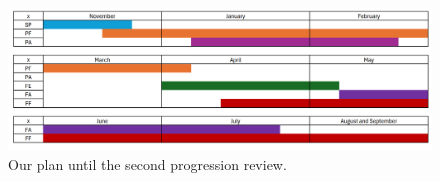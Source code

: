 \begin{figure}[H]
\label{2Plan}
  \includegraphics[width=\linewidth]{Figures/2Plan.png}
  \caption{Our plan until the second progression review.}
\end{figure}


